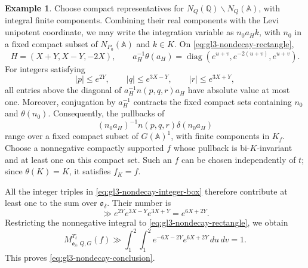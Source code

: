 \documentclass[12pt]{amsart}
\theoremstyle{definition}
\newtheorem{example}[definition]{Example}
\theoremstyle{plain}
\theoremstyle{remark}
\def\Q{\mathbb{Q}}%
\def\A{\mathbb{A}}%
\DeclareMathOperator{\diag}{diag} %
\newcommand{\fo}{\mathfrak{o}}
\numberwithin{equation}{section}
\begin{document}
\begin{example}
Choose compact representatives for $N_Q(\Q)\backslash N_Q(\A)$,
with integral finite components.
Combining their real components with the Levi unipotent coordinate,
we may write the integration variable as $n_0a_Hk$, with $n_0$
in a fixed compact subset of $N_{P_0}(\A)$ and $k\in K$.
On \eqref{eq:gl3-nondecay-rectangle},
\[
 H=(X+Y,X-Y,-2X),\qquad
 a_H^{-1}\theta(a_H)=\diag(e^{u+v},e^{-2(u+v)},e^{u+v}).
\]
For integers satisfying
\begin{equation}\label{eq:gl3-nondecay-integer-box}
 |p|\le e^{2Y},\qquad |q|\le e^{3X-Y},\qquad |r|\le e^{3X+Y},
\end{equation}
all entries above the diagonal of $a_H^{-1}n(p,q,r)a_H$
have absolute value at most one.
Moreover, conjugation by $a_H^{-1}$ contracts the fixed compact
sets containing $n_0$ and $\theta(n_0)$.
Consequently, the pullbacks of
\[
 (n_0a_H)^{-1}n(p,q,r)\delta(n_0a_H)
\]
range over a fixed compact subset of $G(\A)^1$, with finite
components in $K_f$.
Choose a nonnegative compactly supported $f$ whose pullback is
bi-$K$-invariant and at least one on this compact set.
Such an $f$ can be chosen independently of $t$; since
$\theta(K)=K$, it satisfies $f_K=f$.

All the integer triples in \eqref{eq:gl3-nondecay-integer-box}
therefore contribute at least one to the sum over $\fo_\delta$.
Their number is
\[
 \gg e^{2Y}e^{3X-Y}e^{3X+Y}=e^{6X+2Y}.
\]
Restricting the nonnegative integral to
\eqref{eq:gl3-nondecay-rectangle}, we obtain
\[
 M_{\fo_\delta,Q,G}^{T_t}(f)
 \gg \int_1^2\int_1^2 e^{-6X-2Y}e^{6X+2Y}\,du\,dv=1.
\]
This proves \eqref{eq:gl3-nondecay-conclusion}.
\end{example}
\end{document}
